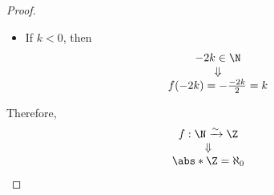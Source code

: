 \begin{proof}
\begin{itemize}
\begin{itemize}
                  \[
                    \begin{array}{c}
                      2k + 1 \in \N \\
                      \Downarrow    \\
                      f(2k + 1) = \frac{(2k + 1) - 1}{2} = \frac{2k}{2} = k
                    \end{array}
                  \]
            \item If $k < 0$, then
                  \[
                    \begin{array}{c}
                      -2k \in \N \\
                      \Downarrow \\
                      f(-2k) = - \frac{-2k}{2} = k
                    \end{array}
                  \]
          \end{itemize}
  \end{itemize}
  Therefore,
  \[
    \begin{array}{c}
      f: \N \xrightarrow{\sim} \Z \\
      \Downarrow                  \\
      \abs*{\Z} = \aleph_{0}
    \end{array}
  \]
\end{proof}
